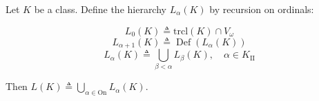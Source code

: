Let $K$ be a class. Define the hierarchy $L_\alpha(K)$ by recursion on ordinals:

$$L_0(K) \triangleq \text{trcl}(K) \cap V_\omega$$
$$L_{\alpha+1}(K) \triangleq \operatorname{Def}(L_\alpha(K))$$
$$L_\alpha(K) \triangleq \bigcup_{\beta < \alpha} L_\beta(K), \quad \alpha \in K_{\mathrm{II}}$$

Then $L(K) \triangleq \bigcup_{\alpha \in \mathrm{On}} L_\alpha(K)$.
